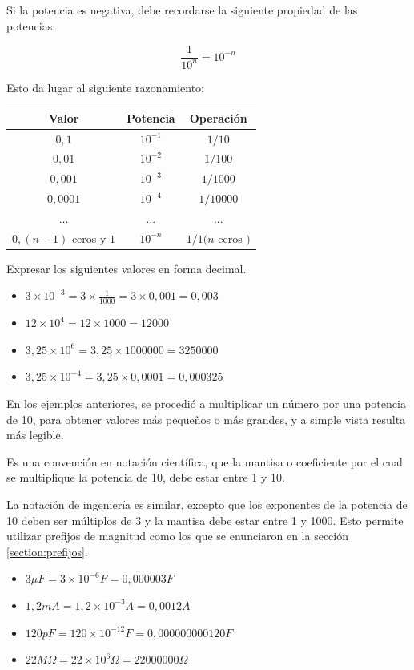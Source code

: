 Si la potencia es negativa, debe recordarse la siguiente propiedad de las potencias:

$$ \frac{1}{10^{n}}=10^{-n} $$

Esto da lugar al siguiente razonamiento:

\begin{tabular}{|c|c|c|}
\hline 
Valor & Potencia & Operación \\ 
\hline 
$0,1$ & $10^{-1}$ & $1/10$ \\ 
\hline 
$0,01$ & $10^{-2}$ & $1/100$ \\ 
\hline 
$0,001$ & $10^{-3}$ & $1/1000$ \\ 
\hline 
$0,0001$ & $10^{-4}$ & $1/10000$ \\ 
\hline 
... & ... & ... \\ 
\hline 
$0,(n-1)$ ceros y $1$ & $10^{-n}$ & $1/1(n$ ceros $)$ \\ 
\hline 
\end{tabular}

\begin{ejemplo}
Expresar los siguientes valores en forma decimal.
	\begin{itemize}
		\item $ 3 \times 10^{-3}=3\times \frac{1}{1000}=3\times 0,001 = 0,003 $
		\item $ 12 \times 10^{4}= 12 \times 1000 = 12000 $
		\item $ 3,25 \times 10^{6} = 3,25 \times 1000000 = 3250000 $
		\item $ 3,25 \times 10^{-4}= 3,25 \times 0,0001 = 0,000325 $
	\end{itemize}
\end{ejemplo}

En los ejemplos anteriores, se procedió a multiplicar un número por una potencia de 10, para obtener valores más pequeños o más grandes, y a simple vista resulta más legible.

Es una convención en notación científica, que la mantisa o coeficiente por el cual se multiplique la potencia de 10, debe estar entre 1 y 10.

La notación de ingeniería es similar, excepto que los exponentes de la potencia de 10 deben ser múltiplos de 3 y la mantisa debe estar entre 1 y 1000. Esto permite utilizar prefijos de magnitud como los que se enunciaron en la sección \ref{section:prefijos}.

\begin{ejemplo}
	\begin{itemize}
	Convertir las siguientes medidas para eliminar los prefijos, según la tabla de la sección \ref{section:prefijos}.
		\item $ 3 \mu F = 3\times 10^{-6} F=0,000003 F$
		\item $ 1,2 mA = 1,2 \times 10^{-3} A= 0,0012 A$
		\item $ 120 pF = 120 \times 10^{-12} F=0,000000000120 F$
		\item $ 22 M\Omega = 22 \times 10^{6} \Omega = 22000000 \Omega $
	\end{itemize}
\end{ejemplo}


